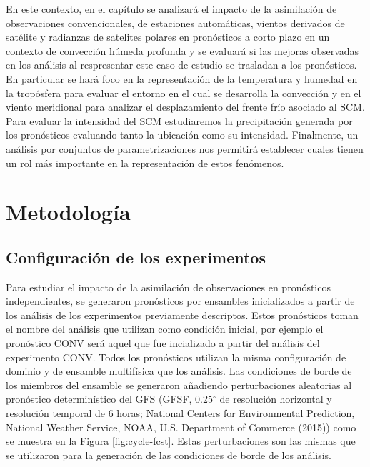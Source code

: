\documentclass[12pt,oneside,a4paper]{reedthesis}
\begin{document}
En este contexto, en el capítulo se analizará el impacto de la asimilación de observaciones convencionales, de
estaciones automáticas, vientos derivados de satélite y radianzas de satelites polares en pronósticos a corto plazo en un contexto de convección húmeda profunda y se evaluará si las mejoras observadas en los análisis al respresentar este caso de estudio se trasladan a los pronósticos. En particular se hará foco en la representación de la temperatura y humedad en la tropósfera para evaluar el entorno en el cual se desarrolla la convección y en el viento meridional para analizar el desplazamiento del frente frío asociado al SCM. Para evaluar la intensidad del SCM estudiaremos la precipitación generada por los pronósticos evaluando tanto la ubicación como su intensidad. Finalmente, un análisis por conjuntos de parametrizaciones nos permitirá establecer cuales tienen un rol más importante en la representación de estos fenómenos.

\hypertarget{metodologuxeda-1}{%
\section{Metodología}\label{metodologuxeda-1}}

\hypertarget{configuraciuxf3n-de-los-experimentos}{%
\subsection{Configuración de los experimentos}\label{configuraciuxf3n-de-los-experimentos}}

Para estudiar el impacto de la asimilación de observaciones en pronósticos independientes, se generaron pronósticos por ensambles inicializados a partir de los análisis de los experimentos previamente descriptos. Estos pronósticos toman el nombre del análisis que utilizan como condición inicial, por ejemplo el pronóstico CONV será aquel que fue incializado a partir del análisis del experimento CONV. Todos los pronósticos utilizan la misma configuración de dominio y de ensamble multifísica que los análisis. Las condiciones de borde de los miembros del ensamble se generaron añadiendo perturbaciones aleatorias al pronóstico determinístico del GFS (GFSF, 0.25\(^{\circ}\) de resolución horizontal y resolución temporal de 6 horas; National Centers for Environmental Prediction, National Weather Service, NOAA, U.S. Department of Commerce (2015)) como se muestra en la Figura \ref{fig:cycle-fcst}. Estas perturbaciones son las mismas que se utilizaron para la generación de las condiciones de borde de los análisis.
\end{document}
